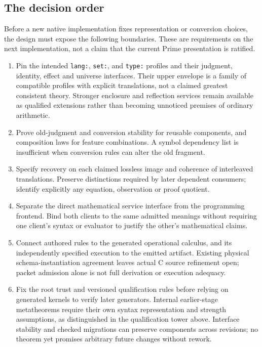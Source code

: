 \documentclass[11pt]{article}
\theoremstyle{definition}
\theoremstyle{remark}
\begin{document}
\subsection{The decision order}

Before a new native implementation fixes representation or conversion choices,
the design must expose the following boundaries. These are requirements on the
next implementation, not a claim that the current Prime presentation is ratified.

\begin{enumerate}
\item Pin the intended \texttt{lang:}, \texttt{set:}, and \texttt{type:}
  profiles and their judgment, identity, effect and universe interfaces.
  Their upper envelope is a family of compatible profiles with explicit
  translations, not a claimed greatest consistent theory. Stronger enclosure
  and reflection services remain available as qualified extensions rather than
  becoming unnoticed premises of ordinary arithmetic.
\item Prove old-judgment and conversion stability for reusable components,
  and composition laws for feature combinations. A symbol dependency list is
  insufficient when conversion rules can alter the old fragment.
\item Specify recovery on each claimed lossless image and coherence of
  interleaved translations. Preserve distinctions required by later dependent
  consumers; identify explicitly any equation, observation or proof quotient.
\item Separate the direct mathematical service interface from the programming
  frontend. Bind both clients to the same admitted meanings without requiring
  one client's syntax or evaluator to justify the other's mathematical claims.
\item Connect authored rules to the generated operational calculus, and its
  independently specified execution to the emitted artifact. Existing physical
  schema-instantiation agreement leaves actual C source refinement open;
  packet admission alone is not full derivation or execution adequacy.
\item Fix the root trust and versioned qualification rules before relying on
  generated kernels to verify later generators. Internal earlier-stage
  metatheorems require their own syntax representation and strength assumptions,
  as distinguished in the qualification tower above. Interface stability and
  checked migrations can preserve components across revisions; no theorem yet
  promises arbitrary future changes without rework.
\end{enumerate}
\end{document}

